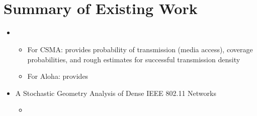 \section{\\ Summary of Existing Work}\label{app:palm}
%
\cite{baccelli2009stochasticVII}
\begin{itemize}
  \item
  \begin{itemize}
    \item For CSMA: provides probability of transmission (media access), coverage probabilities, and rough estimates for successful transmission density
    \item For Aloha: provides
  \end{itemize}
  \item A Stochastic Geometry Analysis of Dense IEEE 802.11 Networks\cite{Nguyen2007}
  \begin{itemize}
    \item
  \end{itemize}
\end{itemize}
